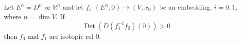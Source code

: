 Let $E^n = D^n$ or $\mathbb{R}^n$ and let $f_i: (E^n, 0) \to (V, x_0)$ be an embedding, $i = 0, 1$, where $n = \dim V$. If
$$\operatorname{Det}(D(f_1^{-1}f_0)(0)) > 0$$
then $f_0$ and $f_1$ are isotopic rel $0$.
